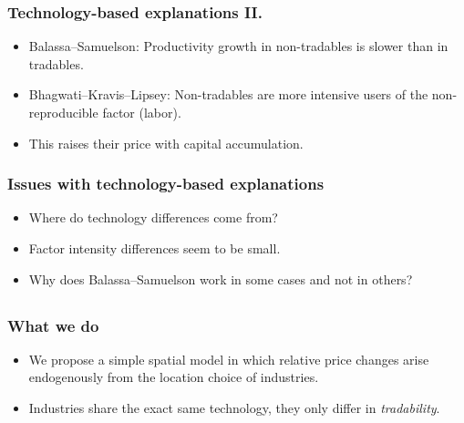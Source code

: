 \documentclass[compress,mathserif]{beamer}
\begin{document}
\begin{frame}\frametitle{Technology-based explanations II.}

\begin{itemize}
    \item<1-> Balassa--Samuelson: Productivity growth in non-tradables is slower than in tradables. \hyperlink{PPF-balassa}{}
    \item<2-> Bhagwati--Kravis--Lipsey: Non-tradables are more intensive users of the non-reproducible factor (labor).
    \item<2-> This raises their price with capital accumulation.\hyperlink{PPF-bhagwati}{}
\end{itemize}
\end{frame}

\begin{frame}\frametitle{Issues with technology-based explanations}

\begin{itemize}
    \item<1-> Where do technology differences come from?
    \item<2-> Factor intensity differences seem to be small. \hyperlink{Valentinyi}{}
    \item<3-> Why does Balassa--Samuelson work in some cases and not in others? \hyperlink{sc_penn}{} \hyperlink{chicken}{}
\end{itemize}
\end{frame}


\subsection{}

\begin{frame}\frametitle{What we do}

\begin{itemize}
    \item We propose a simple spatial model in which relative price changes arise endogenously from the location choice of industries.
    \item Industries share the exact same technology, they only differ in \emph{tradability}.
\end{itemize}

\end{frame}
\end{document}
